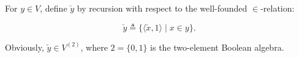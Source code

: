 For $y \in V$, define $\check{y}$ by recursion with respect to the well-founded $\in$-relation:

$$\check{y} \triangleq \{ \langle \check{x}, 1 \rangle \mid x \in y \}.$$

Obviously, $\check{y} \in V^{(2)}$, where $2 = \{0, 1\}$ is the two-element Boolean algebra.
